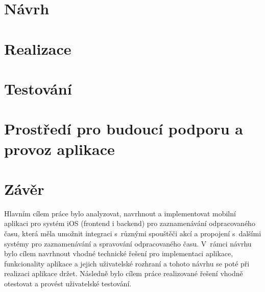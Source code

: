 

\chapter{Návrh}



\chapter{Realizace}



\chapter{Testování}



\chapter{Prostředí pro budoucí podporu a provoz aplikace}



\chapter*{Závěr}

Hlavním cílem práce bylo analyzovat, navrhnout a implementovat mobilní aplikaci pro systém iOS (frontend i backend) pro zaznamenávání odpracovaného času, která měla umožnit integraci s~různými spouštěči akcí a propojení s~dalšími systémy pro zaznamenávání a spravování odpracovaného času. V~rámci návrhu bylo cílem navrhnout vhodné technické řešení pro implementaci aplikace, funkcionality aplikace a jejich uživatelské rozhraní a tohoto návrhu se poté při realizaci aplikace držet. Následně bylo cílem práce realizované řešení vhodně otestovat a provést uživatelské testování. 

